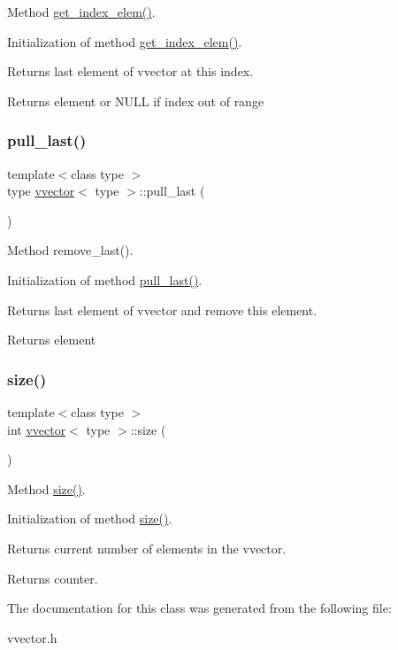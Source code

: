 Method \hyperlink{classvvector_a6df759ba66353840d0b9f915a7c6338c}{get\+\_\+index\+\_\+elem()}. 

Initialization of method \hyperlink{classvvector_a6df759ba66353840d0b9f915a7c6338c}{get\+\_\+index\+\_\+elem()}.

Returns last element of vvector at this index. \begin{DoxyReturn}{Returns}
element or N\+U\+LL if index out of range 
\end{DoxyReturn}
\mbox{\label{classvvector_a1fbc380bcfd3b101886e571dbecf0c87}} 
\subsubsection{\texorpdfstring{pull\+\_\+last()}{pull\_last()}}
{\footnotesize\ttfamily template$<$class type $>$ \\
type \hyperlink{classvvector}{vvector}$<$ type $>$\+::pull\+\_\+last (\begin{DoxyParamCaption}{ }\end{DoxyParamCaption})}



Method remove\+\_\+last(). 

Initialization of method \hyperlink{classvvector_a1fbc380bcfd3b101886e571dbecf0c87}{pull\+\_\+last()}.

Returns last element of vvector and remove this element. \begin{DoxyReturn}{Returns}
element 
\end{DoxyReturn}
\mbox{\label{classvvector_ad7e9467e6de94a74f39a512a5ce9a08f}} 
\subsubsection{\texorpdfstring{size()}{size()}}
{\footnotesize\ttfamily template$<$class type $>$ \\
int \hyperlink{classvvector}{vvector}$<$ type $>$\+::size (\begin{DoxyParamCaption}{ }\end{DoxyParamCaption})}



Method \hyperlink{classvvector_ad7e9467e6de94a74f39a512a5ce9a08f}{size()}. 

Initialization of method \hyperlink{classvvector_ad7e9467e6de94a74f39a512a5ce9a08f}{size()}.

Returns current number of elements in the vvector.

\begin{DoxyReturn}{Returns}
counter. 
\end{DoxyReturn}


The documentation for this class was generated from the following file\+:\begin{DoxyCompactItemize}
\item 
vvector.\+h\end{DoxyCompactItemize}
